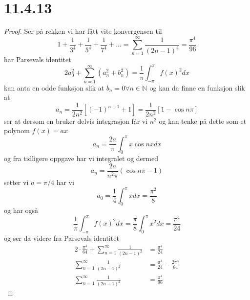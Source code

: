 \documentclass{report}
\newcommand{\M}[2]{\mathbb{#1}^{#2}}
\newcommand{\nbrack}[1]{\left( #1 \right)}
\newcommand{\bbrack}[1]{\left[ #1 \right]}
\begin{document}
\section*{11.4.13}
\begin{proof}
  Ser på rekken vi har fått vite konvergensen til
  \begin{equation}
    \label{eq:14}
    1 + \frac{1}{3^{4}} + \frac{1}{5^{4}} + \frac{1}{7^{4}} + \dots = \sum_{n=1}^{\infty} \frac{1}{(2n-1)^{4}} = \frac{\pi^{4}}{96}
  \end{equation}
  har Parsevals identitet
  \begin{equation}
    \label{eq:15}
    2a_{0}^{2} + \sum_{n=1}^{\infty} \nbrack{ a_{n}^{2} + b_{n}^{2} } = \frac{1}{\pi} \int_{-\pi}^{\pi} f(x)^{2} dx
  \end{equation}
  kan anta en odde funksjon slik at $b_{n} = 0 \forall n\in\M{N}{}$ og kan da finne en funksjon slik at
  \begin{equation}
    \label{eq:16}
    a_{n} = \frac{1}{2n^{2}} \bbrack{ (-1)^{n+1} + 1 } = \frac{1}{2n^{2}}\bbrack{ 1 - \cos n\pi }
  \end{equation}
  ser at dersom en bruker delvis integrasjon får vi $n^{2}$ og kan tenke på dette som et polynom $f(x) = ax$
  \begin{equation}
    \label{eq:5}
    a_{n} = \frac{2a}{\pi} \int_{0}^{\pi} x\cos nx dx
  \end{equation}
  og fra tidligere oppgave har vi integralet og dermed
  \begin{equation}
    \label{eq:11}
    a_{n} = \frac{2a}{n^{2}\pi}\nbrack{ \cos n\pi - 1 }
  \end{equation}
  setter vi $a = \pi /4$ har vi
  \begin{equation}
    \label{eq:17}
    a_{0} = \frac{1}{4} \int_{0}^{\pi} x dx = \frac{\pi^{2}}{8}
  \end{equation}
  og har også
  \begin{equation}
    \label{eq:18}
    \frac{1}{\pi} \int_{-\pi}^{\pi} f(x)^{2} dx = \frac{\pi}{8} \int_{0}^{\pi} x^{2} dx = \frac{\pi^{4}}{24}
  \end{equation}
  og ser da videre fra Parsevals identitet
  \begin{equation}
    \label{eq:19}
    \begin{split}
      2\cdot \frac{\pi^{4}}{64} + \sum_{n=1}^{\infty} \frac{1}{\nbrack{2n-1}^{2}} &= \frac{\pi^{4}}{24} \\
      \sum_{n=1}^{\infty} \frac{1}{\nbrack{2n-1}^{2}} &= \frac{\pi^{4}}{24} - \frac{2 \pi^{4}}{64} \\
      \sum_{n=1}^{\infty} \frac{1}{\nbrack{2n-1}^{2}} &= \frac{\pi^{4}}{96}
    \end{split}
  \end{equation}
\end{proof}
\end{document}
